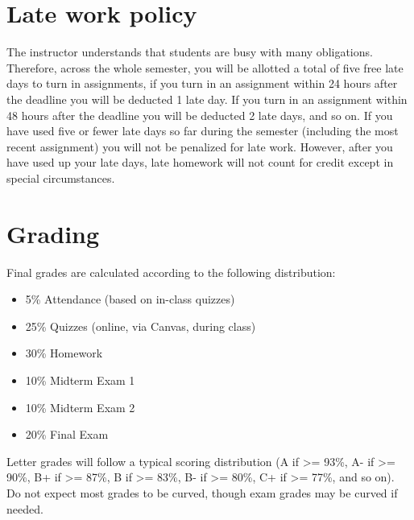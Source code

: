 \documentclass[10pt]{memoir}
\begin{document}
\section{\textbf{Late work policy}}
The instructor understands that students are busy with many obligations. Therefore, across the whole semester, you will be allotted a total of five free late days to turn in assignments, if you turn in an assignment within 24 hours after the deadline you will be deducted 1 late day. If you turn in an assignment within 48 hours after the deadline you will be deducted 2 late days, and so on. If you have used five or fewer late days so far during the semester (including the most recent assignment) you will not be penalized for late work. However, after you have used up your late days, late homework will not count for credit except in special circumstances.

\section{\textbf{Grading}}

Final grades are calculated according to the following distribution:
\begin{itemize}
\item 5\% Attendance (based on in-class quizzes)
\item 25\% Quizzes (online, via Canvas, during class)
\item 30\% Homework
\item 10\% Midterm Exam 1
\item 10\% Midterm Exam 2
\item 20\% Final Exam
\end{itemize}

Letter grades will follow a typical scoring distribution (A if >= 93\%, A- if >= 90\%, B+ if >=
87\%, B if >= 83\%, B- if >= 80\%, C+ if >= 77\%, and so on). Do not expect most grades to be
curved, though exam grades may be curved if needed.

\end{document}
